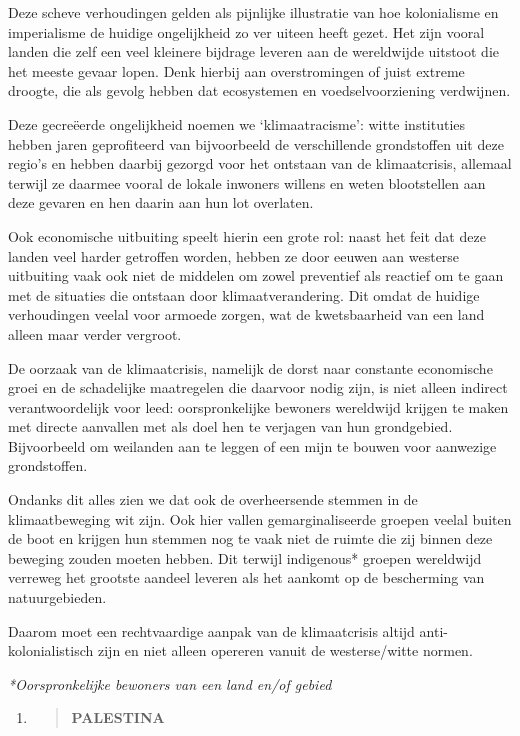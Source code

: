 Deze scheve verhoudingen gelden als pijnlijke illustratie van hoe
kolonialisme en imperialisme de huidige ongelijkheid zo ver uiteen heeft
gezet. Het zijn vooral landen die zelf een veel kleinere bijdrage
leveren aan de wereldwijde uitstoot die het meeste gevaar lopen. Denk
hierbij aan overstromingen of juist extreme droogte, die als gevolg
hebben dat ecosystemen en voedselvoorziening verdwijnen.

Deze gecreëerde ongelijkheid noemen we `klimaatracisme': witte
instituties hebben jaren geprofiteerd van bijvoorbeeld de verschillende
grondstoffen uit deze regio's en hebben daarbij gezorgd voor het
ontstaan van de klimaatcrisis, allemaal terwijl ze daarmee vooral de
lokale inwoners willens en weten blootstellen aan deze gevaren en hen
daarin aan hun lot overlaten.

Ook economische uitbuiting speelt hierin een grote rol: naast het feit
dat deze landen veel harder getroffen worden, hebben ze door eeuwen aan
westerse uitbuiting vaak ook niet de middelen om zowel preventief als
reactief om te gaan met de situaties die ontstaan door
klimaatverandering. Dit omdat de huidige verhoudingen veelal voor
armoede zorgen, wat de kwetsbaarheid van een land alleen maar verder
vergroot.

De oorzaak van de klimaatcrisis, namelijk de dorst naar constante
economische groei en de schadelijke maatregelen die daarvoor nodig zijn,
is niet alleen indirect verantwoordelijk voor leed: oorspronkelijke
bewoners wereldwijd krijgen te maken met directe aanvallen met als doel
hen te verjagen van hun grondgebied. Bijvoorbeeld om weilanden aan te
leggen of een mijn te bouwen voor aanwezige grondstoffen.

Ondanks dit alles zien we dat ook de overheersende stemmen in de
klimaatbeweging wit zijn. Ook hier vallen gemarginaliseerde groepen
veelal buiten de boot en krijgen hun stemmen nog te vaak niet de ruimte
die zij binnen deze beweging zouden moeten hebben. Dit terwijl
indigenous* groepen wereldwijd verreweg het grootste aandeel leveren als
het aankomt op de bescherming van natuurgebieden.

Daarom moet een rechtvaardige aanpak van de klimaatcrisis altijd
anti-kolonialistisch zijn en niet alleen opereren vanuit de
westerse/witte normen.

\emph{*Oorspronkelijke bewoners van een land en/of gebied}

\begin{enumerate}
\def\labelenumi{\arabic{enumi}.}
\setcounter{enumi}{15}
\item
  \begin{quote}
  \textbf{PALESTINA}
  \end{quote}
\end{enumerate}

